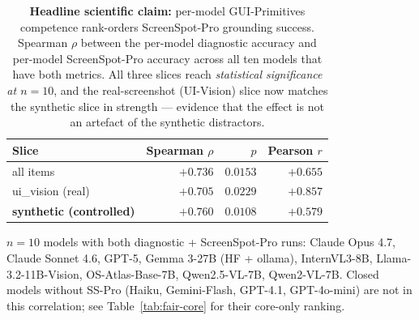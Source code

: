 \begin{table}[t]
\centering
\small
\begin{threeparttable}
\caption{\textbf{Headline scientific claim:} per-model GUI-Primitives
competence rank-orders ScreenSpot-Pro grounding success. Spearman $\rho$
between the per-model diagnostic accuracy and per-model ScreenSpot-Pro
accuracy across all ten models that have both metrics. All three
slices reach \emph{statistical significance at $n{=}10$}, and the
real-screenshot (UI-Vision) slice now matches the synthetic slice in
strength --- evidence that the effect is not an artefact of the
synthetic distractors.}
\label{tab:spearman}
\begin{tabular}{@{}lrrr@{}}
\toprule
\textbf{Slice} & \textbf{Spearman $\rho$} & \textbf{$p$} & \textbf{Pearson $r$} \\
\midrule
all items                       & $+0.736$           & $0.0153$           & $+0.655$ \\
ui\_vision (real)               & $+0.705$           & $0.0229$           & $+0.857$ \\
\textbf{synthetic (controlled)} & $\mathbf{+0.760}$  & $\mathbf{0.0108}$  & $+0.579$ \\
\bottomrule
\end{tabular}
\begin{tablenotes}
\footnotesize
\item $n{=}10$ models with both diagnostic + ScreenSpot-Pro runs:
Claude Opus 4.7, Claude Sonnet 4.6, GPT-5, Gemma 3-27B (HF + ollama),
InternVL3-8B, Llama-3.2-11B-Vision, OS-Atlas-Base-7B, Qwen2.5-VL-7B,
Qwen2-VL-7B. Closed models without SS-Pro
(Haiku, Gemini-Flash, GPT-4.1, GPT-4o-mini) are not in this
correlation; see Table~\ref{tab:fair-core} for their core-only ranking.
\end{tablenotes}
\end{threeparttable}
\end{table}


